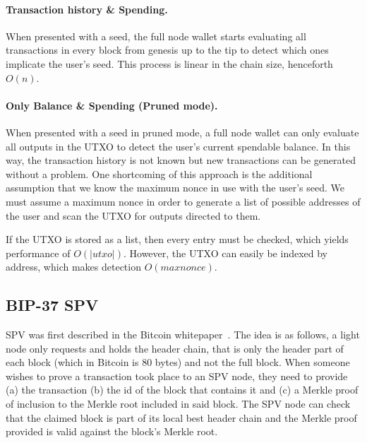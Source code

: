 \paragraph{Transaction history \& Spending.}
When presented with a seed, the full node wallet starts evaluating all transactions in every block from genesis up to the tip to detect which ones implicate the user's seed. This process is linear in the chain size, henceforth $O(n)$.

\paragraph{Only Balance \& Spending (Pruned mode).}
When presented with a seed in pruned mode, a full node wallet can only evaluate all outputs in the UTXO to detect the user's current spendable balance. In this way, the transaction history is not known but new transactions can be generated without a problem. One shortcoming of this approach is the additional assumption that we know the maximum nonce in use with the user's seed. We must assume a maximum nonce in order to generate a list of possible addresses of the user and scan the UTXO for outputs directed to them.

If the UTXO is stored as a list, then every entry must be checked, which yields performance of $O(|utxo|)$. However, the UTXO can easily be indexed by address, which makes detection $O(maxnonce)$.
\subsection{BIP-37 SPV}
SPV was first described in the Bitcoin whitepaper~\cite{bitcoin}.
The idea is as follows, a light node only requests and holds the header chain, that is only the header part of each block (which in Bitcoin is 80 bytes) and not the full block. When someone wishes to prove a transaction took place to an SPV node, they need to provide (a) the transaction (b) the id of the block that contains it and (c) a Merkle proof of inclusion to the Merkle root included in said block. The SPV node can check that the claimed block is part of its local best header chain and the Merkle proof provided is valid against the block's Merkle root.

